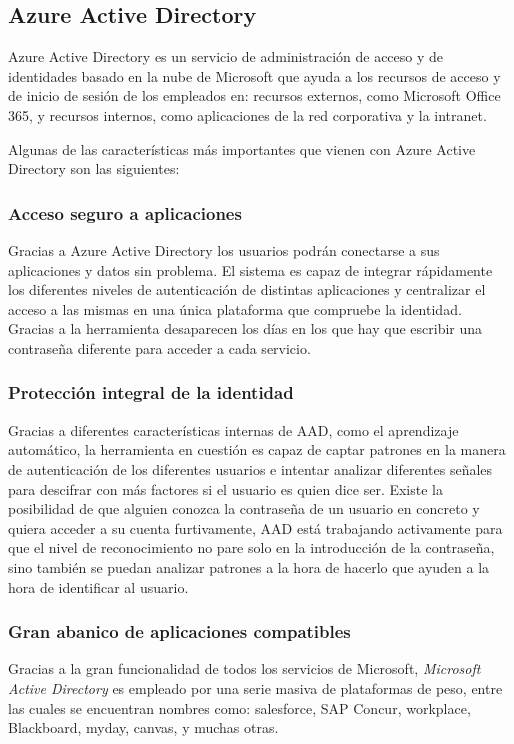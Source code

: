 \documentclass[english,runningheads,a4paper]{llncs}[2018/03/10]
\begin{document}
\subsection*{Azure Active Directory}
Azure Active Directory es un servicio de administración de acceso y de
identidades basado en la nube de Microsoft que ayuda a los recursos de acceso y
de inicio de sesión de los empleados en: recursos externos, como Microsoft
Office 365, y recursos internos, como aplicaciones de la red corporativa y la
intranet.

Algunas de las características más importantes que vienen con Azure Active
Directory son las siguientes:

\subsubsection*{Acceso seguro a aplicaciones}
Gracias a Azure Active Directory los usuarios podrán conectarse a sus
aplicaciones y datos sin problema. El sistema es capaz de integrar rápidamente
los diferentes niveles de autenticación de distintas aplicaciones y centralizar
el acceso a las mismas en una única plataforma que compruebe la identidad.
Gracias a la herramienta desaparecen los días en los que hay que escribir una
contraseña diferente para acceder a cada servicio.

\subsubsection*{Protección integral de la identidad}
Gracias a diferentes características internas de AAD, como el aprendizaje
automático, la herramienta en cuestión es capaz de captar patrones en la manera
de autenticación de los diferentes usuarios e intentar analizar diferentes
señales para descifrar con más factores si el usuario es quien dice ser. Existe
la posibilidad de que alguien conozca la contraseña de un usuario en concreto y
quiera acceder a su cuenta furtivamente, AAD está trabajando activamente para
que el nivel de reconocimiento no pare solo en la introducción de la contraseña,
sino también se puedan analizar patrones a la hora de hacerlo que ayuden a la
hora de identificar al usuario.

\subsubsection*{Gran abanico de aplicaciones compatibles}
Gracias a la gran funcionalidad de todos los servicios de Microsoft,
\textit{Microsoft Active Directory} es empleado por una serie masiva de
plataformas de peso, entre las cuales se encuentran nombres como: salesforce,
SAP Concur, workplace, Blackboard, myday, canvas, y muchas otras. 
\end{document}
